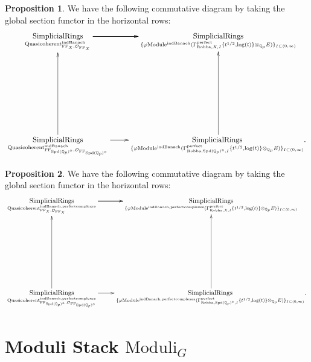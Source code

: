 \documentclass[12pt]{book}
\theoremstyle{definition}
\newtheorem{proposition}{Proposition}
\begin{document}
\begin{proposition}
We have the following commutative diagram by taking the global section functor in the horizontal rows:
\[\displayindent=+0in
\xymatrix@R+7pc{
\underset{\mathrm{Quasicoherent}^{\mathrm{indBanach}}_{\mathrm{FF}_X,\mathcal{O}_{\mathrm{FF}_X}}}{\mathrm{SimplicialRings}}  \ar[r] \ar[r] \ar[r] &\underset{\{\varphi\mathrm{Module}^{\mathrm{indBanach}}(\Gamma^\text{perfect}_{\text{Robba},X,I}\{t^{1/2},\log(t)\}\otimes_{\mathbb{Q}_p}E)\}_{I\subset (0,\infty)}}{\mathrm{SimplicialRings}}   \\
\underset{\mathrm{Quasicoherent}^{\mathrm{indBanach}}_{\mathrm{FF}_{\mathrm{Spd}(\mathbb{Q}_p)^\diamond},\mathcal{O}_{\mathrm{FF}_{\mathrm{Spd}(\mathbb{Q}_p)^\diamond}}}}{\mathrm{SimplicialRings}} \ar[u]\ar[r] &\underset{\{\varphi\mathrm{Module}^\text{indBanach}(\Gamma^\text{perfect}_{\text{Robba},{\mathrm{Spd}(\mathbb{Q}_p)^\diamond},I}\{t^{1/2},\log(t)\}\otimes_{\mathbb{Q}_p}E)\}_{I\subset (0,\infty)}}{\mathrm{SimplicialRings}}.\ar[u]  
}
\]
\end{proposition}

\begin{proposition}
We have the following commutative diagram by taking the global section functor in the horizontal rows:
\[\displayindent=+0in
\xymatrix@C+0in@R+7pc{
\underset{\mathrm{Quasicoherent}^{\mathrm{indBanach,perfectcomplexes}}_{\mathrm{FF}_X,\mathcal{O}_{\mathrm{FF}_X}}}{\mathrm{SimplicialRings}}  \ar[r] \ar[r] \ar[r] &\underset{\{\varphi\mathrm{Module}^{\mathrm{indBanach,perfectcomplexes}}(\Gamma^\text{perfect}_{\text{Robba},X,I}\{t^{1/2},\log(t)\}\otimes_{\mathbb{Q}_p}E)\}_{I\subset (0,\infty)}}{\mathrm{SimplicialRings}}   \\
\underset{\mathrm{Quasicoherent}^{\mathrm{indBanach,perfectcomplexes}}_{\mathrm{FF}_{\mathrm{Spd}(\mathbb{Q}_p)^\diamond},\mathcal{O}_{\mathrm{FF}_{\mathrm{Spd}(\mathbb{Q}_p)^\diamond}}}}{\mathrm{SimplicialRings}} \ar[u]\ar[r] &\underset{\{\varphi\mathrm{Module}^{\mathrm{indBanach,perfectcomplexes}}(\Gamma^\text{perfect}_{\text{Robba},{\mathrm{Spd}(\mathbb{Q}_p)^\diamond},I}\{t^{1/2},\log(t)\}\otimes_{\mathbb{Q}_p}E)\}_{I\subset (0,\infty)}}{\mathrm{SimplicialRings}}.\ar[u]  
}
\]

\end{proposition}












\chapter{Moduli Stack $\mathrm{Moduli}_G$}
\end{document}
